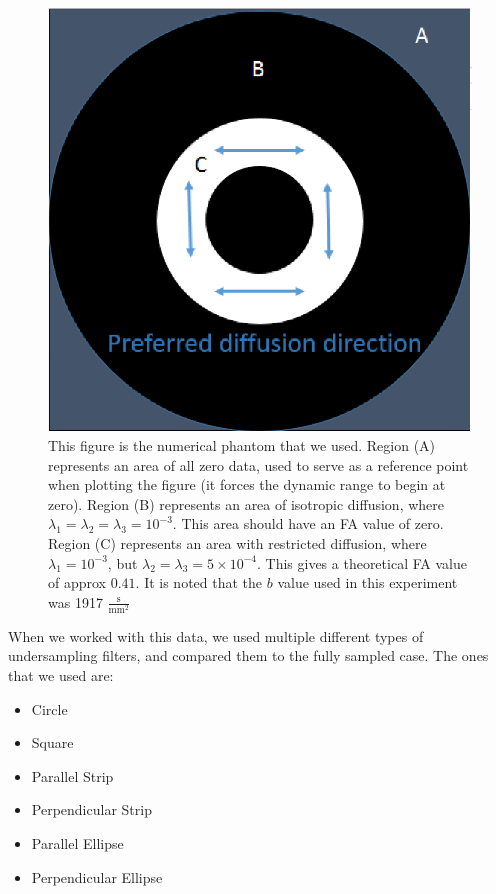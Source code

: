 \documentclass[11 pt]{article}
\begin{document}
    \begin{figure}[!h] 

      \centering
      \vspace{0pt}
      \setlength\fboxsep{0pt}
      \setlength\fboxrule{0.5pt}
      \includegraphics[trim = {0mm 0mm 0mm 0mm},clip,scale = 0.8] {Figs/numericalSims/Phantom.eps}
      \caption{This figure is the numerical phantom that we used. Region (A) represents an area of all zero data, used to serve as a reference point when plotting the figure (it forces the dynamic range to begin at zero). Region (B) represents an area of isotropic diffusion, where $\lambda_1 = \lambda_2 = \lambda_3 = 10^{-3}$. This area should have an FA value of zero. Region (C) represents an area with restricted diffusion, where $\lambda_1 = 10^{-3}$, but $\lambda_2 = \lambda_3 = 5 \times 10^{-4}$. This gives a theoretical FA value of approx $0.41$. It is noted that the $b$ value used in this experiment was 1917 $\frac{\text{s}}{\text{mm}^2}$}
      \label{fig:NumPhant}

  \end{figure}
    
    
    When we worked with this data, we used multiple different types of undersampling filters, and compared them to the fully sampled case. The ones that we used are:
    \begin{itemize}
      \item Circle
      \item Square
      \item Parallel Strip
      \item Perpendicular Strip
      \item Parallel Ellipse
      \item Perpendicular Ellipse
    \end{itemize}
\end{document}
